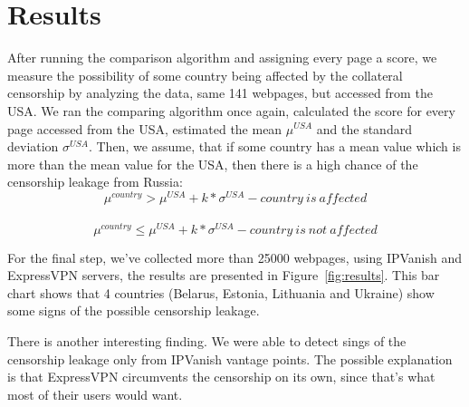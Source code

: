 \documentclass[conference]{IEEEtran}
\begin{document}
\section{Results}
After running the comparison algorithm and assigning every page a score, we measure the possibility of some country being affected by the collateral censorship by analyzing the data, same 141 webpages, but accessed from the USA. We ran the comparing algorithm once again, calculated the score for every page accessed from the USA, estimated the mean $\mu^{USA}$ and the standard deviation $\sigma^{USA}$. Then, we assume, that if some country has a mean value which is more than the mean value for the USA, then there is a high chance of the censorship leakage from Russia:
\[\mu^{country} > \mu^{USA} + k*\sigma^{USA} - country\ is\ affected\]\\
\[\mu^{country} \leq \mu^{USA} + k*\sigma^{USA} - country\ is\ not\ affected\]

For the final step, we've collected more than 25000 webpages, using IPVanish and ExpressVPN servers, the results are presented in Figure~\ref{fig:results}.
This bar chart shows that 4 countries (Belarus, Estonia, Lithuania and Ukraine) show some signs of the possible censorship leakage.

There is another interesting finding. We were able to detect sings of the censorship leakage only from IPVanish vantage points. The possible explanation is that ExpressVPN circumvents the censorship on its own, since that's what most of their users would want.
\end{document}
